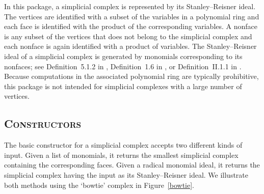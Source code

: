 \documentclass[12pt,leqno]{amsart}
\theoremstyle{definition}
\begin{document}
In this package, a simplicial complex is represented by its Stanley--Reisner
ideal. The vertices are identified with a subset of the variables in a
polynomial ring and each face is identified with the product of the
corresponding variables.  A nonface is any subset of the vertices that does
not belong to the simplicial complex and each nonface is again identified with
a product of variables. The Stanley--Reisner ideal of a simplicial complex is
generated by monomials corresponding to its nonfaces; see Definition~5.1.2 in
\cite{BH}, Definition~1.6 in \cite{MS}, or Definition~II.1.1 in
\cite{Stanley}. Because computations in the associated polynomial ring are
typically prohibitive, this package is not intended for simplicial complexes
with a large number of vertices.

\subsection*{\scshape\mdseries Constructors}

The basic constructor for a simplicial complex accepts two different kinds of
input.  Given a list of monomials, it returns the smallest simplicial complex
containing the corresponding faces.  Given a radical monomial ideal, it
returns the simplicial complex having the input as its Stanley--Reisner
ideal. We illustrate both methods using the `bowtie' complex in
Figure~\ref{bowtie}.
\end{document}
